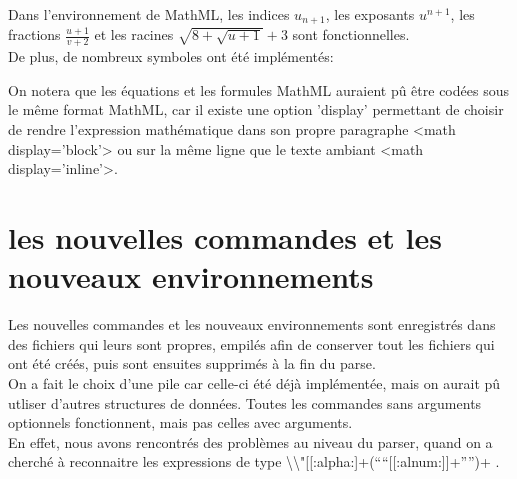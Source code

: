 \documentclass[10pt,a4paper]{report}
\begin{document}
Dans l'environnement de MathML, les indices $u_{n+1}$, les exposants $u^{n+1}$, les fractions $\frac{u+1}{v+2}$ et les racines $\sqrt{8+\sqrt{u+1}} +3$ sont fonctionnelles.
\\De plus, de nombreux symboles ont été implémentés:


On notera que les équations et les formules MathML auraient pû être codées sous le même format MathML, car il existe une option 'display' permettant de choisir de rendre l'expression mathématique dans son propre paragraphe <math display='block'> ou sur la même ligne que le texte ambiant <math display='inline'>.

\section{les nouvelles commandes et les nouveaux environnements}

Les nouvelles commandes et les nouveaux environnements sont enregistrés dans des fichiers qui leurs sont propres, empilés afin de conserver tout les fichiers qui ont été créés, puis sont ensuites supprimés à la fin du parse.\\On a fait le choix d'une pile car celle-ci été déjà implémentée, mais on aurait pû utliser d'autres structures de données.
Toutes les commandes sans arguments optionnels fonctionnent, mais pas celles avec arguments.\\En effet, nous avons rencontrés des problèmes au niveau du parser, quand on a cherché à reconnaitre les expressions de type  \textbackslash\textbackslash"[[:alpha:]+(``{``[[:alnum:]]+''}'')+ .
\end{document}
